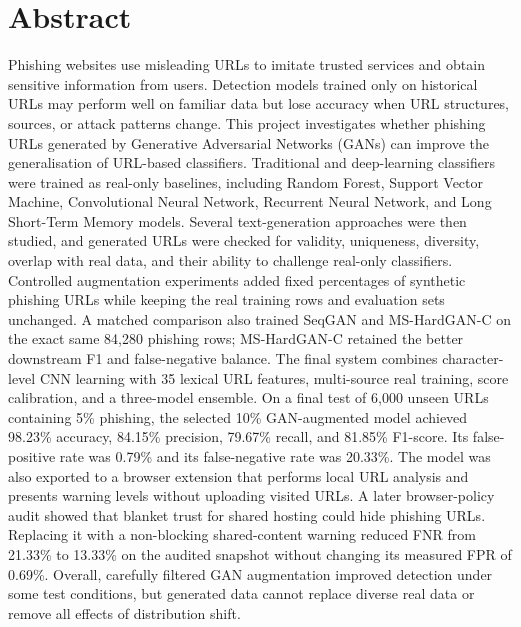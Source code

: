 \chapter*{Abstract}

Phishing websites use misleading URLs to imitate trusted services and obtain
sensitive information from users. Detection models trained only on historical
URLs may perform well on familiar data but lose accuracy when URL structures,
sources, or attack patterns change. This project investigates whether phishing
URLs generated by Generative Adversarial Networks (GANs) can improve the
generalisation of URL-based classifiers. Traditional and deep-learning
classifiers were trained as real-only baselines, including Random Forest,
Support Vector Machine, Convolutional Neural Network, Recurrent Neural Network,
and Long Short-Term Memory models. Several text-generation approaches were
then studied, and generated URLs were checked for validity, uniqueness,
diversity, overlap with real data, and their ability to challenge real-only
classifiers. Controlled augmentation experiments added fixed percentages of
synthetic phishing URLs while keeping the real training rows and evaluation
sets unchanged. A matched comparison also trained SeqGAN and MS-HardGAN-C on
the exact same 84,280 phishing rows; MS-HardGAN-C retained the better downstream
F1 and false-negative balance. The final system combines character-level CNN learning with 35
lexical URL features, multi-source real training, score calibration, and a
three-model ensemble. On a final test of 6,000 unseen URLs containing 5\%
phishing, the selected 10\% GAN-augmented model achieved 98.23\% accuracy,
84.15\% precision, 79.67\% recall, and 81.85\% F1-score. Its false-positive
rate was 0.79\% and its false-negative rate was 20.33\%. The model was also
exported to a browser extension that performs local URL analysis and presents
warning levels without uploading visited URLs. A later browser-policy audit
showed that blanket trust for shared hosting could hide phishing URLs. Replacing
it with a non-blocking shared-content warning reduced FNR from 21.33\% to
13.33\% on the audited snapshot without changing its measured FPR of 0.69\%.
Overall, carefully filtered GAN augmentation improved detection under some test
conditions, but generated data cannot replace diverse real data or remove all
effects of distribution shift.

\clearpage

